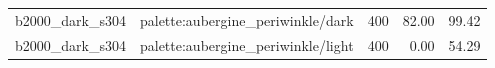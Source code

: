 \begin{longtable}{l>{\raggedright\arraybackslash}p{.42\linewidth}rrr}
b2000\_\allowbreak{}dark\_\allowbreak{}s304 & %
palette:aubergine\_\allowbreak{}periwinkle/dark & %
400 & %
82.00 & %
99.42 \\ %

b2000\_\allowbreak{}dark\_\allowbreak{}s304 & %
palette:aubergine\_\allowbreak{}periwinkle/light & %
400 & %
0.00 & %
54.29 \\ %


\end{longtable}
